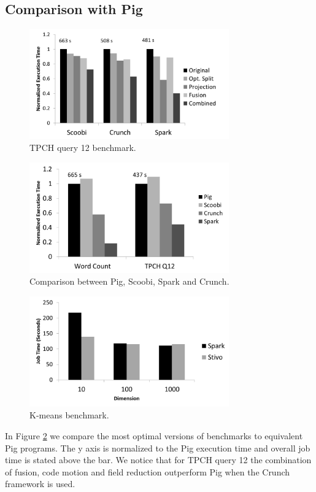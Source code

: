 \subsection{Comparison with Pig}
\label{subsec:pig}
\begin{figure}[t]
    \includegraphics[width=8.6cm]{figures/tpch}
   \caption{TPCH query 12 benchmark.}
  \label{fig:tpch}%
\end{figure}
\begin{figure}[t]
    \includegraphics[width=8.6cm]{figures/pig}
   \caption{Comparison between Pig, Scoobi, Spark and Crunch.}
   \label{fig:pig}%
\end{figure}

\begin{figure}[t]
    \includegraphics[width=8.6cm]{figures/k-means}
   \caption{K-means benchmark.}
   \label{fig:k-means}%
\end{figure}

In Figure \ref{fig:pig} we compare the most optimal versions of benchmarks to equivalent Pig programs. The y axis is normalized to the Pig execution time and overall job time is stated above the bar. We notice that for TPCH query 12 the combination of fusion, code motion and field reduction outperform Pig when the Crunch framework is used. 

